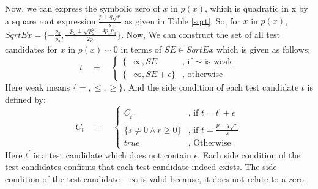 Now, we can express the symbolic zero of $x$ in $p(x)$, which is quadratic in x by a square root expression $\frac{p+q\sqrt{r}}{s}$ as given in Table \ref{sqrt}.\newline
So, for $x$ in $p(x)$, $SqrtEx=\{-\frac{p_{3}}{p_{2}}, \frac{-p_{2}\pm \sqrt{p_{2}^{2}-4p_{1}p_{3}}}{2p_{1}}\}$. Now, We can construct the set of all test candidates for $x$ in $p(x)\sim 0$ in terms of $SE\in SqrtEx$ which is given as follows:
		$$
		t
\quad = \quad 
\left\{
\begin{array}{ll}
{\displaystyle \{-\infty,SE} 
& 
\text{, if }\sim \text{ is weak }
\\[0.6cm] %
{\displaystyle \{-\infty,SE+\epsilon\}}
& 
\text{, otherwise }
\end{array}
\right.$$
Here weak means $\{=,\leq,\geq\}$.\newline
And the side condition of each test candidate $t$ is defined by:
		$$
C_t
\quad = \quad 
\left\{
\begin{array}{lll}
{\displaystyle C_{t^{\prime}}}
& 
\text{, if } t = t^{\prime} + \epsilon
\\[0.6cm] %
{\displaystyle \{s\neq 0 \wedge r\geq 0\}}
& 
\text{, if } t = \frac{p+q\sqrt{r}}{s}
\\[0.6cm] %
{\displaystyle true}
& 
\text{, Otherwise }
\end{array}
\right.$$
Here $t^{\prime}$ is a test candidate which does not contain $\epsilon$.\newline
Each side condition of the test candidates confirms that each test candidate indeed exists. The side condition of the test candidate $-\infty$ is valid because, it does not relate to a zero.

